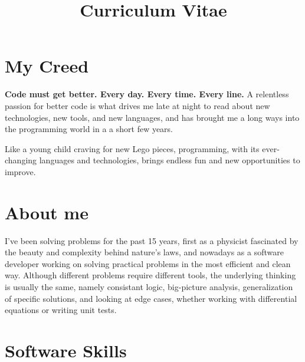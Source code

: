 \documentclass[11pt,a4paper,sans]{moderncv}        %
\title{Curriculum Vitae}                               %
\begin{document}
\makecvtitle


\section{My Creed}



    \textbf{Code must get better. Every day. Every time. Every line.} A relentless passion for better code is what drives
     me late at night to read about new technologies, new tools, and new languages, and has brought me a long ways into the programming world in a a short few years.


   Like a young child craving for new Lego pieces, programming, with its ever-changing languages and technologies, brings endless fun and new opportunities to improve.





\section{About me}

    I've been solving problems for the past 15 years, first as a physicist fascinated by the beauty and complexity behind nature's laws, and nowadays as a software
    developer working on solving practical problems in the most efficient and clean way. Although different problems require different tools, the underlying thinking
    is usually the same, namely consistant logic, big-picture analysis, generalization of specific solutions, and looking at edge cases, whether working with
    differential equations or writing unit tests.


\section{Software Skills}
\end{document}
